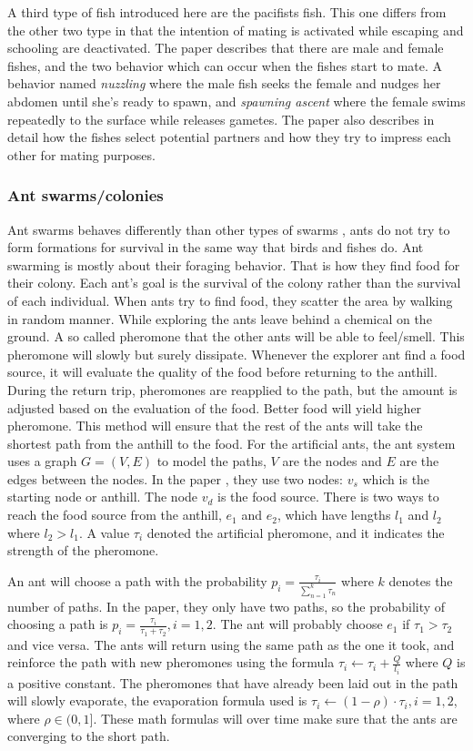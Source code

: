A third type of fish introduced here are the pacifists fish. This one differs from the other two type in that the intention of mating is activated while escaping and schooling are deactivated.
The paper describes that there are male and female fishes, and the two behavior which can occur when the fishes start to mate. A behavior named \textit{nuzzling} where the male fish seeks the female and nudges her abdomen until she's ready to spawn, and \textit{spawning ascent} where the female swims repeatedly to the surface while releases gametes. The paper also describes in detail how the fishes select potential partners and how they try to impress each other for mating purposes.

\subsubsection{Ant swarms/colonies}
Ant swarms behaves differently than other types of swarms \citep{Blum2005}, ants do not try to form formations for survival in the same way that birds and fishes do. Ant swarming is mostly about their foraging behavior. That is how they find food for their colony. Each ant's goal is the survival of the colony rather than the survival of each individual. When ants try to find food, they scatter the area by walking in random manner. While exploring the ants leave behind a chemical on the ground. A so called pheromone that the other ants will be able to feel/smell. This pheromone will slowly but surely dissipate. Whenever the explorer ant find a food source, it will evaluate the quality of the food before returning to the anthill. During the return trip, pheromones are reapplied to the path, but the amount is adjusted based on the evaluation of the food. Better food will yield higher pheromone. This method will ensure that the rest of the ants will take the shortest path from the anthill to the food. For the artificial ants, the ant system uses a graph $G = (V,E)$ to model the paths, $V$ are the nodes and $E$ are the edges between the nodes. In the paper \citep{Blum2005}, they use two nodes: $v_s$ which is the starting node or anthill. The node $v_d$ is the food source. There is two ways to reach the food source from the anthill, $e_1$ and $e_2$, which have lengths $l_1$ and $l_2$ where $l_2 > l_1$. A value $\tau_i$ denoted the artificial pheromone, and it indicates the strength of the pheromone. 

An ant will choose a path with the probability $p_i = \frac{\tau_i}{\sum_{ n = 1}^{k}\tau_n}$ where $k$ denotes the number of paths. In the paper, they only have two paths, so the probability of choosing a path is $p_i = \frac{\tau_i}{\tau_1 + \tau_2}, i = 1,2$.
The ant will probably choose $e_1$ if $\tau_1 > \tau_2$ and vice versa.
The ants will return using the same path as the one it took, and reinforce the path with new pheromones using the formula $\tau_i \leftarrow \tau_i + \frac{Q}{l_i}$ where $Q$ is a positive constant. The pheromones that have already been laid out in the path will slowly evaporate, the evaporation formula used is $\tau_i \leftarrow (1-\rho)\cdot\tau_i, i = 1,2$, where $\rho \in (0,1]$. These math formulas will over time make sure that the ants are converging to the short path.

